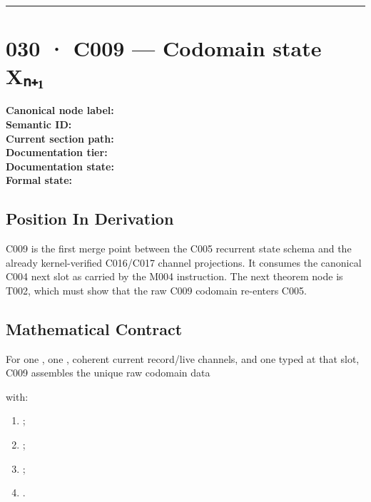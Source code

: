 \begin{center}\rule{0.5\linewidth}{0.5pt}\end{center}

\section{030 · C009 --- Codomain state
Xₙ₊₁}\label{c009-codomain-state-xux2099ux2081}

\textbf{Canonical node label:} \texttt{\protect{}}\\
\textbf{Semantic ID:} \texttt{\protect{}}\\
\textbf{Current section path:} \texttt{\protect{}}\\
\textbf{Documentation tier:} \texttt{\protect{}}\\
\textbf{Documentation state:} \texttt{\protect{}}\\
\textbf{Formal state:}
\texttt{\protect{}}

\subsection{Position In Derivation}\label{position-in-derivation-26}

C009 is the first merge point between the C005 recurrent state schema
and the already kernel-verified C016/C017 channel projections. It
consumes the canonical C004 next slot as carried by the M004
instruction. The next theorem node is T002, which must show that the raw
C009 codomain re-enters C005.

\subsection{Mathematical Contract}\label{mathematical-contract-13}

For one \texttt{\protect{}}, one \texttt{\protect{}},
coherent current record/live channels, and one
\texttt{\protect{}} typed at that slot, C009
assembles the unique raw codomain data

\texttt{\protect{}}

with:

\begin{enumerate}
\def\labelenumi{\arabic{enumi}.}
\tightlist
\item
  \texttt{\protect{}};
\item
  \texttt{\protect{}};
\item
  \texttt{\protect{}};
\item
  \texttt{\protect{}}.
\end{enumerate}

